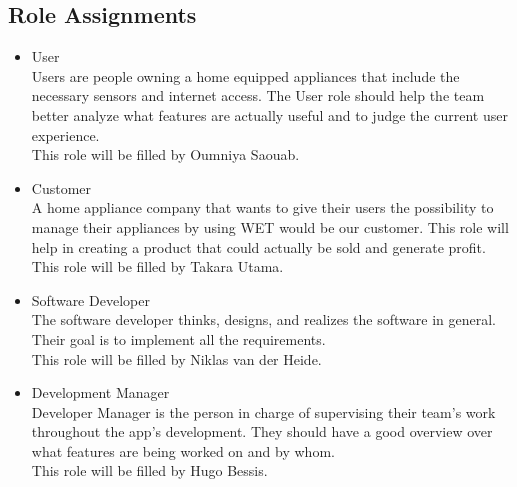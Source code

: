 \documentclass[10pt]{article}
\begin{document}
\begin{multicols}{2}

\section{Role Assignments}

\begin{itemize}
  \item User\\
  Users are people owning a home equipped appliances that include the necessary sensors and internet access. The User role should help the team better analyze what features are actually useful and to judge the current user experience.\\
  This role will be filled by Oumniya Saouab.
  \item Customer\\
  A home appliance company that wants to give their users the possibility to manage their appliances by using WET would be our customer. This role will help in creating a product that could actually be sold and generate profit.\\
  This role will be filled by Takara Utama.
  \item Software Developer\\
  The software developer thinks, designs, and realizes the software in general. Their goal is to implement all the requirements.\\
  This role will be filled by Niklas van der Heide.
  \item Development Manager\\
  Developer Manager is the person in charge of supervising their team's work throughout the app's development. They should have a good overview over what features are being worked on and by whom.\\
  This role will be filled by Hugo Bessis.
\end{itemize}


\end{multicols}
\end{document}
